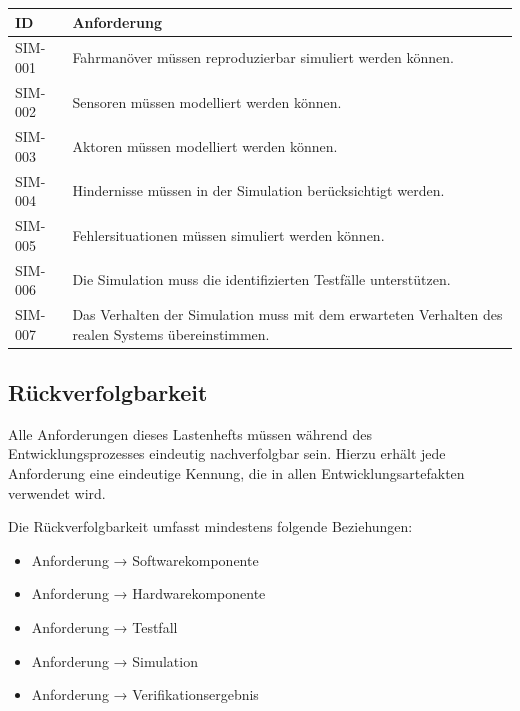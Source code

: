 \begin{longtable}[]{@{}
  >{\raggedright\arraybackslash}p{}
  >{\raggedright\arraybackslash}p{}@{}}
\toprule\noalign{}
\begin{minipage}[b]{\linewidth}\raggedright
ID
\end{minipage} & \begin{minipage}[b]{\linewidth}\raggedright
Anforderung
\end{minipage} \\
\midrule\noalign{}
\endhead
\bottomrule\noalign{}
\endlastfoot
SIM-001 & Fahrmanöver müssen reproduzierbar simuliert werden können. \\
SIM-002 & Sensoren müssen modelliert werden können. \\
SIM-003 & Aktoren müssen modelliert werden können. \\
SIM-004 & Hindernisse müssen in der Simulation berücksichtigt werden. \\
SIM-005 & Fehlersituationen müssen simuliert werden können. \\
SIM-006 & Die Simulation muss die identifizierten Testfälle
unterstützen. \\
SIM-007 & Das Verhalten der Simulation muss mit dem erwarteten Verhalten
des realen Systems übereinstimmen. \\
\end{longtable}

\subsection{Rückverfolgbarkeit}\label{ruxfcckverfolgbarkeit}

Alle Anforderungen dieses Lastenhefts müssen während des
Entwicklungsprozesses eindeutig nachverfolgbar sein. Hierzu erhält jede
Anforderung eine eindeutige Kennung, die in allen Entwicklungsartefakten
verwendet wird.

Die Rückverfolgbarkeit umfasst mindestens folgende Beziehungen:

\begin{itemize}
\tightlist
\item
  Anforderung → Softwarekomponente
\item
  Anforderung → Hardwarekomponente
\item
  Anforderung → Testfall
\item
  Anforderung → Simulation
\item
  Anforderung → Verifikationsergebnis
\end{itemize}

